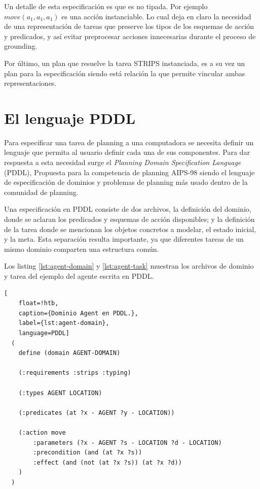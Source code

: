 Un detalle de esta especificación es que es no tipada. Por ejemplo $move(a_1, a_1, a_1)$ es una acción instanciable. Lo cual deja en claro la necesidad de una representación de tareas que preserve los tipos de los esquemas de acción y predicados, y así evitar preprocesar acciones innecesarias durante el proceso de grounding.

Por último, un plan que resuelve la tarea STRIPS instanciada, es a su vez un plan para la especificación siendo está relación la que permite vincular ambas representaciones.

\section{El lenguaje PDDL}

Para especificar una tarea de planning a una computadora se necesita definir un
lenguaje que permita al usuario definir cada una de sus componentes. Para dar
respuesta a esta necesidad surge el \emph{Planning Domain Specification
Language} (PDDL), Propuesta para la competencia de planning
AIPS-98 \citep{McDermott1998} siendo el lenguaje de especificación de dominios y problemas de planning más usado dentro
de la comunidad de planning.

Una especificación en PDDL consiste de dos archivos, la definición del dominio,
donde se aclaran los predicados y esquemas de acción disponibles; y la
definición de la tarea donde se mencionan los objetos concretos a modelar, el
estado inicial, y la meta. Esta separación resulta importante, ya que diferentes
tareas de un mismo dominio comparten una estructura común.

Los listing \ref{lst:agent-domain} y \ref{lst:agent-task} muestran los archivos
de dominio y tarea del ejemplo del agente escrita en PDDL.

\begin{lstlisting}[
    float=!htb,
    caption={Dominio Agent en PDDL.},
    label={lst:agent-domain},
    language=PDDL]
  (
    define (domain AGENT-DOMAIN)

    (:requirements :strips :typing)

    (:types AGENT LOCATION)

    (:predicates (at ?x - AGENT ?y - LOCATION))

    (:action move
        :parameters (?x - AGENT ?s - LOCATION ?d - LOCATION)
        :precondition (and (at ?x ?s))
        :effect (and (not (at ?x ?s)) (at ?x ?d))
    )
  )
\end{lstlisting}

